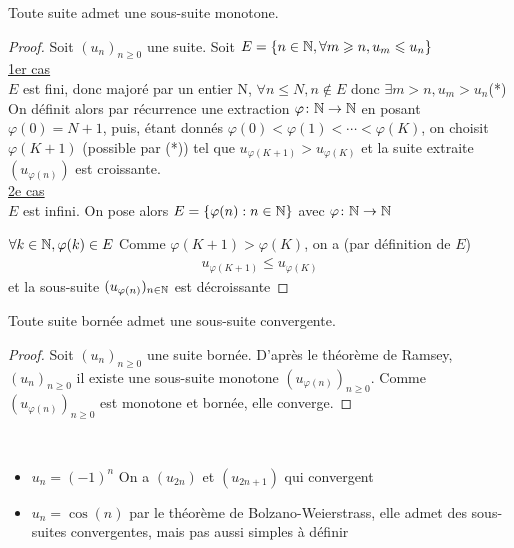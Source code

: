 \begin{graybox}
    \begin{theoreme}
    Toute suite admet une sous-suite monotone.
\end{theoreme}
\end{graybox}

\begin{proof}
    Soit $(u_n)_{n \geq 0}$ une suite. Soit $E = \left\{ n \in \mathbb{N}, \forall m \geqslant n, u_m \leqslant u_n \right\}$ \\
    \underline{1er cas} \\
    $E$ est fini, donc majoré par un entier N, $\forall n \leq N, n \notin E$ donc $\exists m > n, u_m > u_n$(*)
    On définit alors par récurrence une extraction $\varphi \colon \mathbb{N} \to \mathbb{N}$
    en posant $\varphi(0) = N + 1$, puis, étant donnés $\varphi(0) < \varphi(1) < \cdots < \varphi(K)$, on choisit $\varphi(K+1)$ (possible par (*)) tel que 
    $u_{\varphi(K+1)} > u_{\varphi(K)}$ et la suite extraite $(u_{\varphi(n)})$ est croissante. \\
    \underline{2e cas} \\
    $E$ est infini. On pose alors $E = \left\{ \varphi(n) : n \in \mathbb{N} \right\}$ avec $\varphi \colon \mathbb{N} \to \mathbb{N}$
    
    \noindent $\forall k \in \mathbb{N}, \varphi(k) \in E$ Comme $\varphi(K+1) > \varphi(K)$, on a (par définition de $E$)
    \begin{align*}
        u_{\varphi(K+1)} \leq u_{\varphi(K)}
    \end{align*}
    et la sous-suite $(u_{\varphi(n)})_{n \in \mathbb{N}}$ est décroissante 
\end{proof}

\begin{graybox}
    \begin{theoreme}
    Toute suite bornée admet une sous-suite convergente.
\end{theoreme}
\end{graybox}

\begin{proof}
    Soit $(u_n)_{n \geq 0}$ une suite bornée. D'après le théorème de Ramsey, $(u_n)_{n \geq 0}$ il existe une sous-suite monotone $(u_{\varphi(n)})_{n \geq 0}$. Comme $(u_{\varphi(n)})_{n \geq 0}$ est monotone et bornée, elle converge.
\end{proof}

\begin{exemple}~ 
\begin{itemize}
    \item $u_n = (-1)^n$
    On a $(u_{2n})$ et $(u_{2n+1})$ qui convergent
    \item $u_n = \cos(n)$ par le théorème de Bolzano-Weierstrass, elle admet des sous-suites convergentes, mais pas aussi simples à définir
\end{itemize}
    
\end{exemple}

